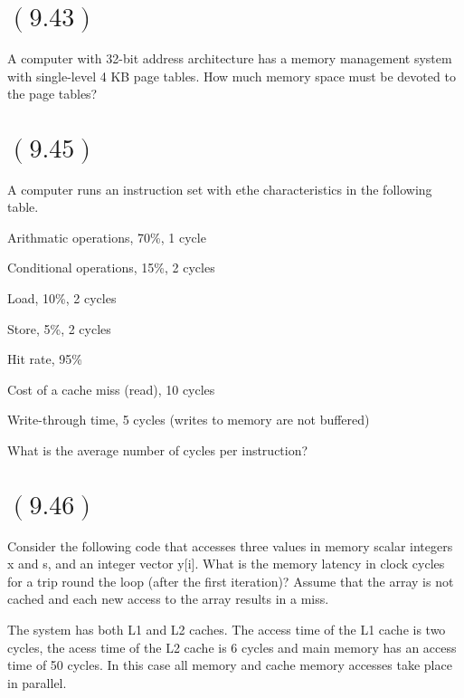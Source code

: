 \documentclass[letterpaper,12pt,titlepage]{article}
\begin{document}
\begin{mdframed}[style=MyFrame]
\end{mdframed}

\section*{$(9.43)$} A computer with 32-bit address architecture has a memory management system with single-level 4 KB page tables. How much memory space must be devoted to the page tables?

\begin{mdframed}[style=MyFrame]
\end{mdframed}

\section*{$(9.45)$} A computer runs an instruction set with ethe characteristics in the following table.

Arithmatic operations, 70\%, 1 cycle

Conditional operations, 15\%, 2 cycles

Load, 10\%, 2 cycles

Store, 5\%, 2 cycles

Hit rate, 95\%

Cost of a cache miss (read), 10 cycles

Write-through time, 5 cycles (writes to memory are not buffered)

What is the average number of cycles per instruction?

\begin{mdframed}[style=MyFrame]
\end{mdframed}

\section*{$(9.46)$} Consider the following code that accesses three values in memory scalar integers x and s, and an integer vector y[i]. What is the memory latency in clock cycles for a trip round the loop (after the first iteration)? Assume that the array is not cached and each new access to the array results in a miss.

The system has both L1 and L2 caches. The access time of the L1 cache is two cycles, the acess time of the L2 cache is 6 cycles and main memory has an access time of 50 cycles. In this case all memory and cache memory accesses take place in parallel.
\end{document}

